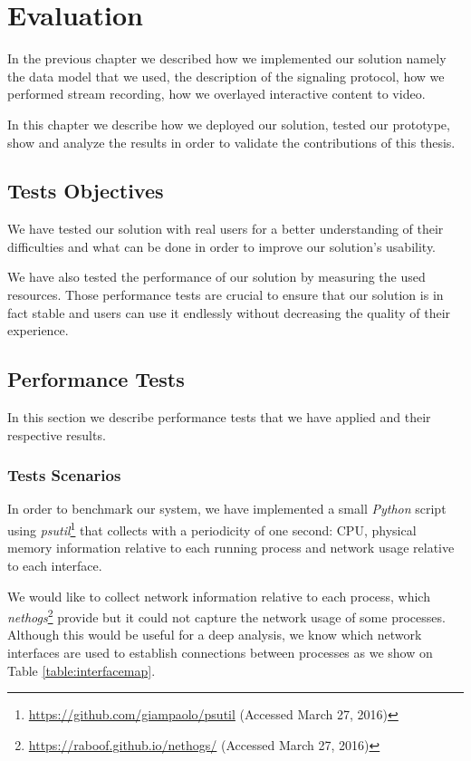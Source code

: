 \chapter{Evaluation}
\label{chapter:evaluation}
  In the previous chapter we described how we implemented our solution namely the data model that we used, the description of the signaling protocol, how we performed stream recording, how we overlayed interactive content to video. 

  In this chapter we describe how we deployed our solution, tested our prototype, show and analyze the results in order to validate the contributions of this thesis.




\section{Tests Objectives}

  We have tested our solution with real users for a better understanding of their difficulties and what can be done in order to improve our solution's usability.

  We have also tested the performance of our solution by measuring the used resources. Those performance tests are crucial to ensure that our solution is in fact stable and users can use it endlessly without decreasing the quality of their experience. 


  \section {Performance Tests}

     In this section we describe performance tests that we have applied and their respective results.


    \subsection{Tests Scenarios}


      In order to benchmark our system, we have implemented a small \emph{Python} script using \emph{psutil}\footnote{\url{https://github.com/giampaolo/psutil} (Accessed March 27, 2016)} that collects with a periodicity of one second: CPU, physical memory information relative to each running process and network usage relative to each interface. 

      We would like to collect network information relative to each process, which \emph{nethogs}\footnote{\url{https://raboof.github.io/nethogs/} (Accessed March 27, 2016)} provide but it could not capture the network usage of some processes. Although this would be useful for a deep analysis, we know which network interfaces are used to establish connections between processes as we show on Table \ref{table:interfacemap}.

